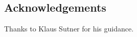 \documentclass[a0,16pt]{a0poster}
\theoremstyle{pleasant}
\newcommand{\0}{\underline{0}}
\newcommand{\1}{\underline{1}}
\newcommand{\2}{\underline{2}}
\begin{document}
\begin{multicols}{3}
\section*{Acknowledgements}

Thanks to Klaus Sutner for his guidance.


\end{multicols}
\end{document}
